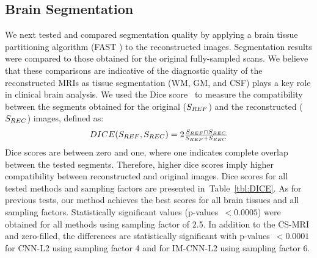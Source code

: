 \documentclass[10pt,journal,compsoc]{IEEEtran}
\begin{document}
%


\subsection{Brain Segmentation}
We next tested and compared segmentation quality by applying a brain tissue partitioning algorithm (FAST \cite{zhang2001segmentation}) to the reconstructed images. Segmentation results were compared to those obtained for the original fully-sampled scans. We believe that these comparisons are indicative of the diagnostic quality of the reconstructed MRIs as tissue segmentation (WM, GM, and CSF) plays a key role in clinical brain analysis.
We used the Dice score~\cite{dice1945measures} to measure the compatibility between the segments obtained for the original ($S_{\mbox{\tiny{REF}}}$) and the reconstructed ($S_{\mbox{\tiny{REC}}}$) images, defined as:
\begin{equation}
\begin{array}{c}
DICE(S_{\mbox{\tiny{REF}}}, S_{\mbox{\tiny{REC}}}) = 2\frac{S_{\mbox{\tiny{REF}}} \cap S_{\mbox{\tiny{REC}}}}{S_{\mbox{\tiny{REF}}} + S_{\mbox{\tiny{REC}}}}
\end{array}
\end{equation}
Dice scores are between zero and one, where one indicates complete overlap between the tested segments. Therefore, higher dice scores imply higher compatibility between reconstructed and original images.
Dice scores for all tested methods and sampling factors are presented in~Table~\ref{tbl:DICE}. As for previous tests, our method achieves the best scores for all brain tissues and all sampling factors. Statistically significant values (p-values~$<0.0005$) were obtained for all methods using sampling factor of 2.5. In addition to the CS-MRI and zero-filled, the differences are statistically significant with p-values~$<0.0001$ for CNN-L2 using sampling factor 4 and for IM-CNN-L2 using sampling factor 6.
\end{document}
